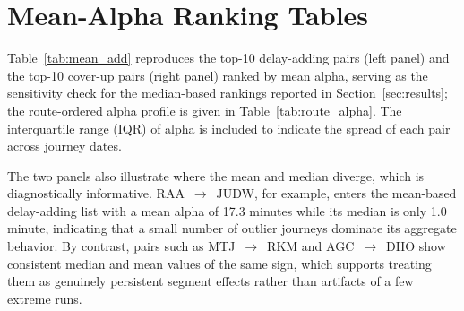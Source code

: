 \documentclass[conference]{IEEEtran}
\begin{document}
\vspace{-6pt}
\section{Mean-Alpha Ranking Tables}
\label{app:mean}

Table~\ref{tab:mean_add} reproduces the top-10 delay-adding pairs (left panel) and the top-10 cover-up pairs (right panel) ranked by mean alpha, serving as the sensitivity check for the median-based rankings reported in Section~\ref{sec:results}; the route-ordered alpha profile is given in Table~\ref{tab:route_alpha}. The interquartile range (IQR) of alpha is included to indicate the spread of each pair across journey dates.

The two panels also illustrate where the mean and median diverge, which is diagnostically informative. RAA~$\rightarrow$~JUDW, for example, enters the mean-based delay-adding list with a mean alpha of 17.3 minutes while its median is only 1.0 minute, indicating that a small number of outlier journeys dominate its aggregate behavior. By contrast, pairs such as MTJ~$\rightarrow$~RKM and AGC~$\rightarrow$~DHO show consistent median and mean values of the same sign, which supports treating them as genuinely persistent segment effects rather than artifacts of a few extreme runs.
\end{document}
